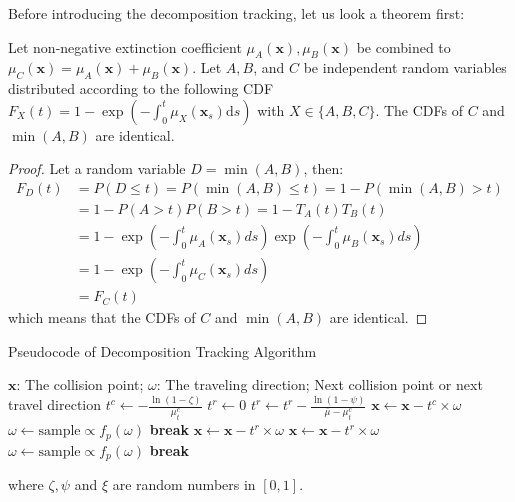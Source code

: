 \documentclass[acmtog]{acmart}
\begin{document}
Before introducing the decomposition tracking, let us look a theorem first:
\begin{theorem}
	Let non-negative extinction coefficient $\mu_A(\mathbf x), \mu_B(\mathbf x)$ be combined to $\mu_C(\mathbf x)=\mu_A(\mathbf x)+\mu_B(\mathbf x)$.
	Let $A,B$, and $C$ be independent random variables distributed according to the following CDF $F_X(t)=1-\exp\left(-\int_0^t\mu_X(\mathbf x_s)\mathrm ds\right)$ with $X\in\{A,B,C\}$. The CDFs of $C$ and $\min(A,B)$ are identical. 
\end{theorem}
\begin{proof}
	Let a random variable $D=\min(A,B)$, then:
	\begin{equation}
		\begin{aligned}
			F_D(t)&=P(D\le t)=P(\min(A,B)\le t)=1-P(\min(A,B)> t)\\
			&=1-P(A>t)P(B>t)=1-T_A(t)T_B(t)\\
			&=1-\exp({-\int_0^t\mu_A(\mathbf x_s)ds})\exp({-\int_0^t\mu_B(\mathbf x_s)ds})\\
			&=1-\exp({-\int_0^t\mu_C(\mathbf x_s)ds})\\
			&=F_C(t)
		\end{aligned}
	\end{equation}
	which means that the CDFs of $C$ and $\min(A,B)$ are identical. 
\end{proof}

\begin{algorithm}[H]
	\caption{Pseudocode of Decomposition Tracking Algorithm}
	\label{decomposition_tracking_algorithm}
	\begin{algorithmic}[1]
		\Require
			$\mathbf x$: The collision point; $\omega$: The traveling direction;
		\Ensure
			Next collision point or next travel direction
				\State $t^c\gets-\frac{\ln(1-\zeta)}{\mu_t^c}$
				\State $t^r\gets0$
					\State $t^r\gets t^r-\frac{\ln(1-\psi)}{\bar\mu-\mu_t^c}$
						\State $\mathbf x\gets\mathbf x-t^c\times\omega$
							\State {}
						\Else
							\State $\omega\gets\mathrm{sample}\propto f_p(\omega)$
							\State \textbf{break}
						\EndIf
					\Else {}
							\State $\mathbf x\gets\mathbf x-t^r\times\omega$
							\State {}
							\State $\mathbf x\gets\mathbf x-t^r\times\omega$
							\State $\omega\gets\mathrm{sample}\propto f_p(\omega)$
							\State \textbf{break}
						\EndIf
					\EndIf
				\EndWhile
			\EndWhile
	\end{algorithmic}
\end{algorithm}
where $\zeta,\psi$ and $\xi$ are random numbers in $[0,1]$.
\end{document}
